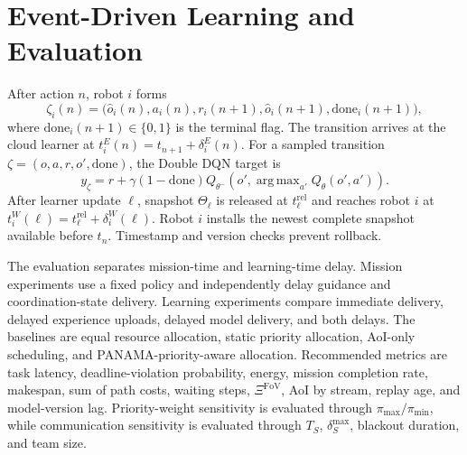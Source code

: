 \IfFileExists{IEEEtran.cls}{\documentclass[conference]{IEEEtran}}{\documentclass[10pt,twocolumn]{article}}
\DeclareMathOperator*{\argmax}{arg\,max}
\begin{document}
\section{Event-Driven Learning and Evaluation}
After action $n$, robot $i$ forms
\begin{equation}
    \zeta_i(n)=\big(\widehat o_i(n),a_i(n),r_i(n+1),
    \widehat o_i(n+1),\mathrm{done}_i(n+1)\big),
\end{equation}
where $\mathrm{done}_i(n+1)\in\{0,1\}$ is the terminal flag. The transition arrives at the cloud learner at $t_i^E(n)=t_{n+1}+\delta_i^E(n)$. For a sampled transition $\zeta=(o,a,r,o',\mathrm{done})$, the Double DQN target is
\begin{equation}
    y_\zeta=r+\gamma(1-\mathrm{done})Q_{\theta^-}
    \left(o',\argmax_{a'}Q_\theta(o',a')\right).
\end{equation}
After learner update $\ell$, snapshot $\Theta_\ell$ is released at $t_\ell^{\mathrm{rel}}$ and reaches robot $i$ at $t_i^W(\ell)=t_\ell^{\mathrm{rel}}+\delta_i^W(\ell)$. Robot $i$ installs the newest complete snapshot available before $t_n$. Timestamp and version checks prevent rollback.

The evaluation separates mission-time and learning-time delay. Mission experiments use a fixed policy and independently delay guidance and coordination-state delivery. Learning experiments compare immediate delivery, delayed experience uploads, delayed model delivery, and both delays. The baselines are equal resource allocation, static priority allocation, AoI-only scheduling, and PANAMA-priority-aware allocation. Recommended metrics are task latency, deadline-violation probability, energy, mission completion rate, makespan, sum of path costs, waiting steps, $\Xi^{\mathrm{FoV}}$, AoI by stream, replay age, and model-version lag. Priority-weight sensitivity is evaluated through $\pi_{\max}/\pi_{\min}$, while communication sensitivity is evaluated through $T_S$, $\delta_S^{\max}$, blackout duration, and team size.
\end{document}
